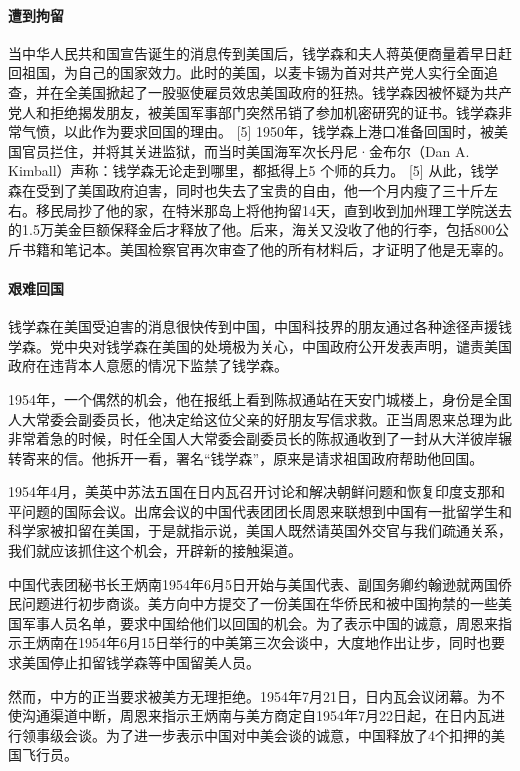 \documentclass[UTF8]{ctexart}
\begin{document}
\paragraph{遭到拘留}
当中华人民共和国宣告诞生的消息传到美国后，钱学森和夫人蒋英便商量着早日赶回祖国，为自己的国家效力。此时的美国，以麦卡锡为首对共产党人实行全面追查，并在全美国掀起了一股驱使雇员效忠美国政府的狂热。钱学森因被怀疑为共产党人和拒绝揭发朋友，被美国军事部门突然吊销了参加机密研究的证书。钱学森非常气愤，以此作为要求回国的理由。 [5] 
1950年，钱学森上港口准备回国时，被美国官员拦住，并将其关进监狱，而当时美国海军次长丹尼·金布尔（Dan A. Kimball）声称：钱学森无论走到哪里，都抵得上5 个师的兵力。 [5]  从此，钱学森在受到了美国政府迫害，同时也失去了宝贵的自由，他一个月内瘦了三十斤左右。移民局抄了他的家，在特米那岛上将他拘留14天，直到收到加州理工学院送去的1.5万美金巨额保释金后才释放了他。后来，海关又没收了他的行李，包括800公斤书籍和笔记本。美国检察官再次审查了他的所有材料后，才证明了他是无辜的。

\paragraph{艰难回国}
钱学森在美国受迫害的消息很快传到中国，中国科技界的朋友通过各种途径声援钱学森。党中央对钱学森在美国的处境极为关心，中国政府公开发表声明，谴责美国政府在违背本人意愿的情况下监禁了钱学森。

1954年，一个偶然的机会，他在报纸上看到陈叔通站在天安门城楼上，身份是全国人大常委会副委员长，他决定给这位父亲的好朋友写信求救。正当周恩来总理为此非常着急的时候，时任全国人大常委会副委员长的陈叔通收到了一封从大洋彼岸辗转寄来的信。他拆开一看，署名“钱学森”，原来是请求祖国政府帮助他回国。 

1954年4月，美英中苏法五国在日内瓦召开讨论和解决朝鲜问题和恢复印度支那和平问题的国际会议。出席会议的中国代表团团长周恩来联想到中国有一批留学生和科学家被扣留在美国，于是就指示说，美国人既然请英国外交官与我们疏通关系，我们就应该抓住这个机会，开辟新的接触渠道。 

中国代表团秘书长王炳南1954年6月5日开始与美国代表、副国务卿约翰逊就两国侨民问题进行初步商谈。美方向中方提交了一份美国在华侨民和被中国拘禁的一些美国军事人员名单，要求中国给他们以回国的机会。为了表示中国的诚意，周恩来指示王炳南在1954年6月15日举行的中美第三次会谈中，大度地作出让步，同时也要求美国停止扣留钱学森等中国留美人员。

然而，中方的正当要求被美方无理拒绝。1954年7月21日，日内瓦会议闭幕。为不使沟通渠道中断，周恩来指示王炳南与美方商定自1954年7月22日起，在日内瓦进行领事级会谈。为了进一步表示中国对中美会谈的诚意，中国释放了4个扣押的美国飞行员。 
\end{document}
